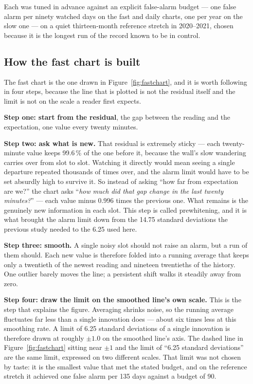 \documentclass[11pt,a4paper]{article}
\begin{document}
Each was tuned in advance against an explicit false-alarm budget --- one false
alarm per ninety watched days on the fast and daily charts, one per year on the
slow one --- on a quiet thirteen-month reference stretch in 2020--2021, chosen
because it is the longest run of the record known to be in control.

\subsection*{How the fast chart is built}

The fast chart is the one drawn in Figure~\ref{fig:fastchart}, and it is worth
following in four steps, because the line that is plotted is not the residual
itself and the limit is not on the scale a reader first expects.

\textbf{Step one: start from the residual}, the gap between the reading and the
expectation, one value every twenty minutes.

\textbf{Step two: ask what is new.} That residual is extremely sticky --- each
twenty-minute value keeps 99.6\,\% of the one before it, because the wall's slow
wandering carries over from slot to slot. Watching it directly would mean seeing
a single departure repeated thousands of times over, and the alarm limit would
have to be set absurdly high to survive it. So instead of asking ``how far from
expectation are we?'' the chart asks ``\emph{how much did that gap change in the
last twenty minutes?}'' --- each value minus 0.996 times the previous one. What
remains is the genuinely new information in each slot. This step is called
prewhitening, and it is what brought the alarm limit down from the 14.75 standard
deviations the previous study needed to the 6.25 used here.

\textbf{Step three: smooth.} A single noisy slot should not raise an alarm, but a
run of them should. Each new value is therefore folded into a running average
that keeps only a twentieth of the newest reading and nineteen twentieths of the
history. One outlier barely moves the line; a persistent shift walks it steadily
away from zero.

\textbf{Step four: draw the limit on the smoothed line's own scale.} This is the
step that explains the figure. Averaging shrinks noise, so the running average
fluctuates far less than a single innovation does --- about six times less at this
smoothing rate. A limit of 6.25 standard deviations of a single innovation is
therefore drawn at roughly $\pm 1.0$ on the smoothed line's axis. The dashed line
in Figure~\ref{fig:fastchart} sitting near $\pm 1$ and the limit of ``6.25
standard deviations'' are the same limit, expressed on two different scales.
That limit was not chosen by taste: it is the smallest value that met the stated
budget, and on the reference stretch it achieved one false alarm per 135 days
against a budget of 90.
\end{document}
